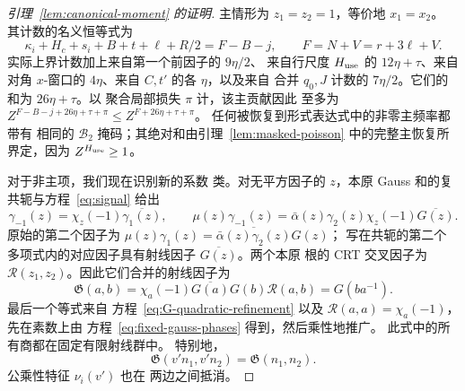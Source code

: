 \documentclass[11pt,a4paper]{article}
\numberwithin{equation}{section}
\numberwithin{figure}{section}
\theoremstyle{definition}
\theoremstyle{remark}
\begin{document}
\begin{proof}[引理~\ref{lem:canonical-moment} 的证明]
主情形为 \(z_1=z_2=1\)，等价地 \(x_1=x_2\)。
其计数的名义恒等式为
\begin{equation}\label{eq:second-principal-exponent}
 \kappa_i+H_c+s_i+B+t+\ell+R/2=F-B-j,
 \qquad F=N+V=r+3\ell+V.
\end{equation}
实际上界计数加上来自第一个前因子的 \(9\eta/2\)、
来自行尺度 \(H_{\rm use}\) 的 \(12\eta+\tau\)、来自
对角 \(x\)-窗口的 \(4\eta\)、来自 \(C,t'\) 的各 \(\eta\)，以及来自
合并 \(q_0,J\) 计数的 \(7\eta/2\)。它们的和为 \(26\eta+\tau\)。以
聚合局部损失 \(\pi\) 计，该主贡献因此
至多为 \(Z^{F-B-j+26\eta+\tau+\pi}\le Z^{F+26\eta+\tau+\pi}\)。
任何被恢复到形式表达式中的非零主频率都带有
相同的 \(\mathcal B_2\) 掩码；其绝对和由引理~\ref{lem:masked-poisson}
中的完整主恢复所界定，因为
\(Z^{H_{\rm use}}\ge1\)。

对于非主项，我们现在识别新的系数
类。对无平方因子的 \(z\)，本原
Gauss 和的复共轭与方程~\eqref{eq:signal} 给出
\[
 \gamma_{-1}(z)=\chi_z(-1)\overline{\gamma_1(z)},\qquad
 \mu(z)\gamma_{-1}(z)
 =\bar\alpha(z)\gamma_2(z)\chi_z(-1)\overline{G(z)}.
\]
原始的第二个因子为
\(\mu(z)\gamma_1(z)=\overline{\bar\alpha(z)\gamma_2(z)}G(z)\)；
写在共轭的第二个
多项式内的对应因子具有射线因子 \(\overline{G(z)}\)。两个本原
根的 CRT 交叉因子为 \(\mathcal R(z_1,z_2)\)。因此它们合并的射线因子为
\[
 \mathfrak G(a,b)=\chi_a(-1)\overline{G(a)}G(b)\mathcal R(a,b)
       =G(ba^{-1}).
\]
最后一个等式来自
方程~\eqref{eq:G-quadratic-refinement} 以及
\(\mathcal R(a,a)=\chi_a(-1)\)，先在素数上由
方程~\eqref{eq:fixed-gauss-phases} 得到，然后乘性地推广。
此式中的所有商都在固定有限射线群中。
特别地，
\[
 \mathfrak G(v'n_1,v'n_2)=\mathfrak G(n_1,n_2).
\]
公乘性特征 \(\nu_i(v')\) 也在
两边之间抵消。


\end{proof}
\end{document}
